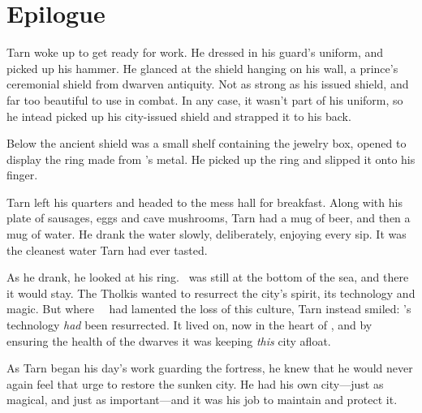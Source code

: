 \chapter*{Epilogue}

Tarn woke up to get ready for work.  He dressed in his guard's uniform, and picked up his hammer.  He glanced at the shield hanging on his wall, a prince's ceremonial shield from dwarven antiquity.  Not as strong as his issued shield, and far too beautiful to use in combat.  In any case, it wasn't part of his uniform, so he intead picked up his city-issued shield and strapped it to his back.

Below the ancient shield was a small shelf containing the jewelry box, opened to display the ring made from \kildir's metal.  He picked up the ring and slipped it onto his finger.

Tarn left his quarters and headed to the mess hall for breakfast.  Along with his plate of sausages, eggs and cave mushrooms, Tarn had a mug of beer, and then a mug of water.  He drank the water slowly, deliberately, enjoying every sip.  It was the cleanest water Tarn had ever tasted.

As he drank, he looked at his ring.  \valdunmir\ was still at the bottom of the sea, and there it would stay.  The Tholkis wanted to resurrect the city's spirit, its technology and magic.  But where \mothzam\ \driktur\ had lamented the loss of this culture, Tarn instead smiled: \valdunmir's technology \emph{had} been resurrected.  It lived on, now in the heart of \korbarthrond, and by ensuring the health of the dwarves it was keeping \emph{this} city afloat.

As Tarn began his day's work guarding the fortress, he knew that he would never again feel that urge to restore the sunken city.  He had his own city---just as magical, and just as important---and it was his job to maintain and protect it.